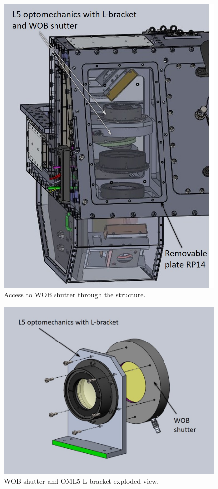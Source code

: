 \documentclass{report}
\begin{document}
\begin{figure}
\begin{center}
\includegraphics[width=0.7\linewidth]{figures/access-to-shutter.jpg}
\end{center}
\caption{Access to WOB shutter through the structure.}
\label{figure:shutter-access}
\end{figure}

\begin{figure}
\begin{center}
\includegraphics[width=0.7\linewidth]{figures/Shutter-EXV.jpg}
\end{center}
\caption{WOB shutter and OML5 L-bracket exploded view.}
\label{figure:shutter-EXV}
\end{figure}
\end{document}
